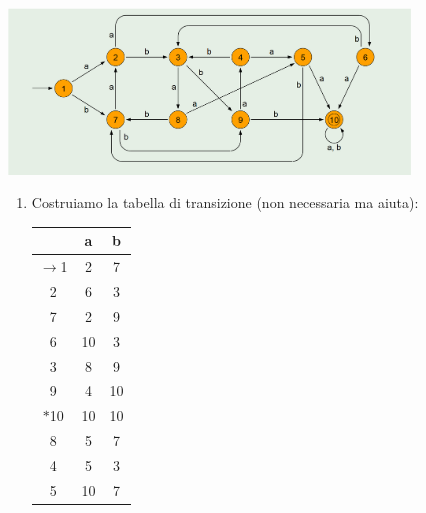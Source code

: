 \documentclass[12pt, a4paper]{report}
\begin{document}
                \begin{example}
                    \begin{center}
                        \includegraphics[width=0.8\textwidth]{Images/minimizzazionefebbraio2024.png}
                    \end{center}
                    \footnotesize
                    \begin{enumerate}
                        \item Costruiamo la tabella di transizione (non necessaria ma aiuta): \begin{center}
                            \begin{tabular}{|c|c|c|}
                                \hline
                                & \textbf{a} & \textbf{b}\\
                                \hline
                                $\to$1 & 2 & 7\\
                                \hline
                                2 & 6 & 3 \\
                                \hline
                                7 & 2 & 9\\
                                \hline
                                6 & 10 & 3\\
                                \hline
                                3 & 8 & 9\\
                                \hline
                                9 & 4 & 10\\
                                \hline
                                $*$10 & 10 & 10\\
                                \hline
                                8 & 5 & 7\\
                                \hline
                                4 & 5 & 3\\
                                \hline
                                5 & 10 & 7\\
                                \hline
                            \end{tabular}

\end{center}
\end{enumerate}
\end{example}
\end{document}
